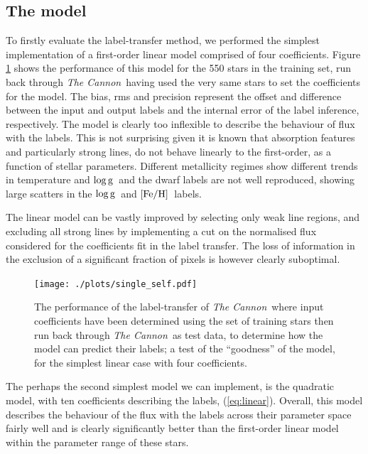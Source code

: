 \documentclass[12pt, preprint]{aastex}
\newcommand{\feh}{\mbox{$\rm [Fe/H]$}}
\newcommand{\logg}{\mbox{$\rm \log g$}}
\newcommand{\tc}{\textsl{The Cannon}}
\begin{document}
\subsection{The model} 

To firstly evaluate the label-transfer method, we performed the simplest implementation of a first-order linear model comprised of four coefficients. Figure \ref{fig:self1} shows the performance of this model for the 550 stars in the training set, run back through \tc\, having used the very same stars to set the coefficients for the model. The bias, rms and precision represent the offset and difference between the input and output labels and the internal error of the label inference, respectively. The model is clearly too inflexible to describe the behaviour of flux with the labels. This is not surprising given it is known that absorption features and particularly strong lines, do not behave linearly to the first-order, as a function of stellar parameters. Different metallicity regimes show different trends in  temperature and \logg\ and the dwarf labels are not well reproduced, showing large scatters in the \logg\ and \feh\ labels. 

The linear model can be vastly improved by selecting only weak line regions, and excluding all strong lines by implementing a cut on the normalised flux considered for the coefficients fit in the label transfer. The loss of information in the exclusion of a significant fraction of pixels is however clearly suboptimal. 

\begin{figure}[h!]
\centering
  \texttt{[image: ./plots/single\_self.pdf]}
\caption{The performance of the label-transfer of \tc\, where input coefficients have been determined using the set of training stars then run back through \tc\ as test data, to determine how the model can predict their labels; a test of the ``goodness'' of the model, for the simplest linear case with four coefficients. }
\label{fig:self1}
\end{figure}

The perhaps the second simplest model we can implement, is the quadratic model, with ten coefficients describing the labels, (\ref{eq:linear}).  Overall, this model describes the behaviour of the flux with the labels across their parameter space fairly well and is clearly significantly better than the first-order linear model within the parameter range of these stars. 
\end{document}
